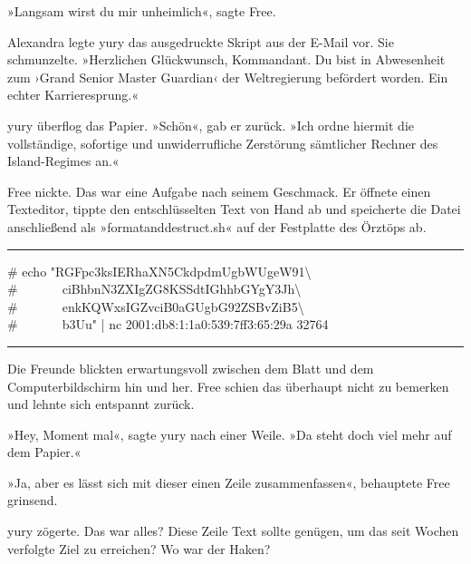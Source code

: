 »Langsam wirst du mir unheimlich«, sagte Free.

Alexandra legte yury das ausgedruckte Skript aus der E-Mail vor. Sie schmunzelte. »Herzlichen Glückwunsch, Kommandant. Du bist in Abwesenheit zum ›Grand Senior Master Guardian‹ der Weltregierung befördert worden. Ein echter Karrieresprung.«

yury überflog das Papier. »Schön«, gab er zurück. »Ich ordne hiermit die vollständige, sofortige und unwiderrufliche Zerstörung sämtlicher Rechner des Island-Regimes an.«

Free nickte. Das war eine Aufgabe nach seinem Geschmack. Er öffnete einen Texteditor, tippte den entschlüsselten Text von Hand ab und speicherte die Datei anschließend als »formatanddestruct.sh« auf der Festplatte des Örztöps ab.

\noindent \parbox{\textwidth}{ \vspace{3ex} \hrule \vspace{3ex}

    \begin{footnotesize}
    \begin{ttfamily}

\noindent \# echo "RGFpc3ksIERhaXN5CkdpdmUgbWUgeW91\textbackslash\\
\noindent \#~~~~~~~ciBhbnN3ZXIgZG8KSSdtIGhhbGYgY3Jh\textbackslash\\
\noindent \#~~~~~~~enkKQWxsIGZvciB0aGUgbG92ZSBvZiB5\textbackslash\\
\noindent \#~~~~~~~b3Uu" | nc 2001:db8:1:1a0:539:7ff3:65:29a 32764

    \end{ttfamily}
    \end{footnotesize}

\vspace{3ex} \hrule \vspace{3ex} }

Die Freunde blickten erwartungsvoll zwischen dem Blatt und dem Computerbildschirm hin und her. Free schien das überhaupt nicht zu bemerken und lehnte sich entspannt zurück.

»Hey, Moment mal«, sagte yury nach einer Weile. »Da steht doch viel mehr auf dem Papier.«

»Ja, aber es lässt sich mit dieser einen Zeile zusammenfassen«, behauptete Free grinsend.

yury zögerte. Das war alles? Diese Zeile Text sollte genügen, um das seit Wochen verfolgte Ziel zu erreichen? Wo war der Haken?

